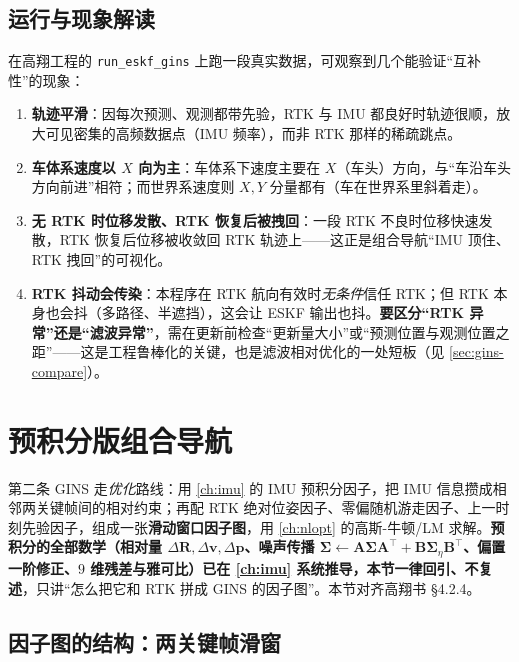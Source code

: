 \subsection{运行与现象解读}
\label{sec:gins-run}
在高翔工程的 \texttt{run\_eskf\_gins} 上跑一段真实数据，可观察到几个能验证“互补性”的现象\cite{gao2023slamad}：
\begin{enumerate}
  \item \textbf{轨迹平滑}：因每次预测、观测都带先验，RTK 与 IMU 都良好时轨迹很顺，放大可见密集的高频数据点（IMU 频率），而非 RTK 那样的稀疏跳点。
  \item \textbf{车体系速度以 $X$ 向为主}：车体系下速度主要在 $X$（车头）方向，与“车沿车头方向前进”相符；而世界系速度则 $X,Y$ 分量都有（车在世界系里斜着走）。
  \item \textbf{无 RTK 时位移发散、RTK 恢复后被拽回}：一段 RTK 不良时位移快速发散，RTK 恢复后位移被收敛回 RTK 轨迹上——这正是组合导航“IMU 顶住、RTK 拽回”的可视化。
  \item \textbf{RTK 抖动会传染}：本程序在 RTK 航向有效时\emph{无条件}信任 RTK；但 RTK 本身也会抖（多路径、半遮挡），这会让 ESKF 输出也抖。\textbf{要区分“RTK 异常”还是“滤波异常”}，需在更新前检查“更新量大小”或“预测位置与观测位置之距”——这是工程鲁棒化的关键，也是滤波相对优化的一处短板（见 \cref{sec:gins-compare}）。
\end{enumerate}

\section{预积分版组合导航}
\label{sec:gins-preint}

第二条 GINS 走\emph{优化}路线：用 \cref{ch:imu} 的 IMU 预积分因子，把 IMU 信息攒成相邻两关键帧间的相对约束；再配 RTK 绝对位姿因子、零偏随机游走因子、上一时刻先验因子，组成一张\textbf{滑动窗口因子图}，用 \cref{ch:nlopt} 的高斯-牛顿/LM 求解。\textbf{预积分的全部数学（相对量 $\Delta\mathbf{R},\Delta\mathbf{v},\Delta\mathbf{p}$、噪声传播 $\boldsymbol{\Sigma}\!\leftarrow\!\mathbf{A}\boldsymbol{\Sigma}\mathbf{A}^\top+\mathbf{B}\boldsymbol{\Sigma}_\eta\mathbf{B}^\top$、偏置一阶修正、$9$ 维残差与雅可比）已在 \cref{ch:imu} 系统推导，本节一律回引、不复述}，只讲“怎么把它和 RTK 拼成 GINS 的因子图”。本节对齐高翔书 §4.2.4\cite{gao2023slamad}。

\subsection{因子图的结构：两关键帧滑窗}
\label{sec:gins-graph}


